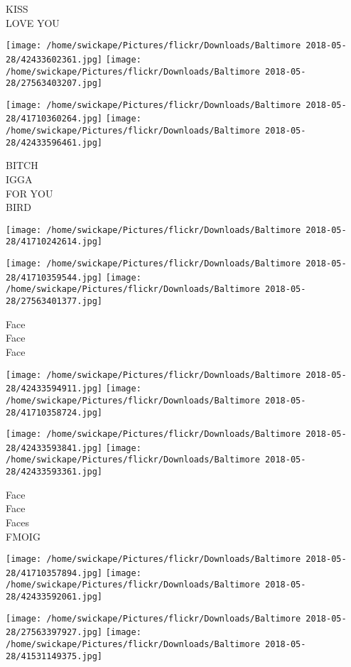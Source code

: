 \documentclass[10pt,letterpaper]{article}
\begin{document}
KISS\\
LOVE YOU
\pagebreak

\texttt{[image: /home/swickape/Pictures/flickr/Downloads/Baltimore 2018-05-28/42433602361.jpg]}
\texttt{[image: /home/swickape/Pictures/flickr/Downloads/Baltimore 2018-05-28/27563403207.jpg]}

\texttt{[image: /home/swickape/Pictures/flickr/Downloads/Baltimore 2018-05-28/41710360264.jpg]}
\texttt{[image: /home/swickape/Pictures/flickr/Downloads/Baltimore 2018-05-28/42433596461.jpg]}

BITCH\\
IGGA\\
FOR YOU\\
BIRD
\pagebreak

\texttt{[image: /home/swickape/Pictures/flickr/Downloads/Baltimore 2018-05-28/41710242614.jpg]}

\vspace{0.25in}
\texttt{[image: /home/swickape/Pictures/flickr/Downloads/Baltimore 2018-05-28/41710359544.jpg]}
\texttt{[image: /home/swickape/Pictures/flickr/Downloads/Baltimore 2018-05-28/27563401377.jpg]}

Face\\
Face\\
Face
\pagebreak

\texttt{[image: /home/swickape/Pictures/flickr/Downloads/Baltimore 2018-05-28/42433594911.jpg]}
\texttt{[image: /home/swickape/Pictures/flickr/Downloads/Baltimore 2018-05-28/41710358724.jpg]}

\texttt{[image: /home/swickape/Pictures/flickr/Downloads/Baltimore 2018-05-28/42433593841.jpg]}
\texttt{[image: /home/swickape/Pictures/flickr/Downloads/Baltimore 2018-05-28/42433593361.jpg]}

Face\\
Face\\
Faces\\
FMOIG
\pagebreak

\texttt{[image: /home/swickape/Pictures/flickr/Downloads/Baltimore 2018-05-28/41710357894.jpg]}
\texttt{[image: /home/swickape/Pictures/flickr/Downloads/Baltimore 2018-05-28/42433592061.jpg]}

\texttt{[image: /home/swickape/Pictures/flickr/Downloads/Baltimore 2018-05-28/27563397927.jpg]}
\texttt{[image: /home/swickape/Pictures/flickr/Downloads/Baltimore 2018-05-28/41531149375.jpg]}
\end{document}
